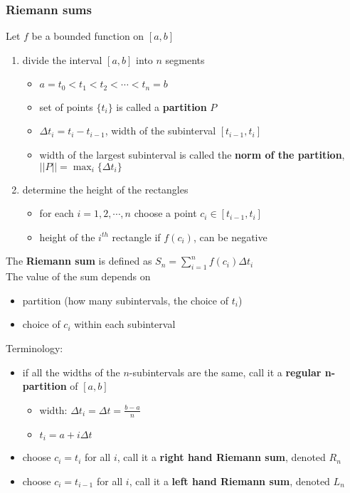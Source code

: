 \documentclass[12pt, letterpaper]{article}
\begin{document}
\subsubsection{Riemann sums}
Let $f$ be a bounded function on $[a,b]$
\begin{enumerate}
    \item divide the interval $[a,b]$ into $n$ segments
    \begin{itemize}
        \item $a = t_0 < t_1 < t_2 < \cdots < t_n = b$
        \item set of points $\{t_i\}$ is called a \textbf{partition} $P$
        \item $\Delta t_i = t_i - t_{i-1}$, width of the subinterval $[t_{i-1}, t_i]$
        \item width of the largest subinterval is called the \textbf{norm of the partition}, $||P|| = \displaystyle\max_i \{\Delta t_i\}$
    \end{itemize}
    \item determine the height of the rectangles
    \begin{itemize}
        \item for each $i = 1, 2, \cdots, n$ choose a point $c_i \in [t_{i-1}, t_i]$
        \item height of the $i^{th}$ rectangle if $f(c_i)$, can be negative
    \end{itemize}
\end{enumerate}
The \textbf{Riemann sum} is defined as $S_n = \displaystyle\sum_{i=1}^{n} f(c_i)\Delta t_i$ \\
The value of the sum depends on 
\begin{itemize}
    \item partition (how many subintervals, the choice of $t_i$)
    \item choice of $c_i$ within each subinterval
\end{itemize}
Terminology:
\begin{itemize}
    \item if all the widths of the $n$-subintervals are the same, call it a \textbf{regular n-partition} of $[a,b]$
    \begin{itemize}
        \item width: $\Delta t_i = \Delta t = \frac{b-a}{n}$
        \item $t_i = a + i\Delta t$
    \end{itemize}
    \item choose $c_i = t_i$ for all $i$, call it a \textbf{right hand Riemann sum}, denoted $R_n$
    \item choose $c_i = t_{i-1}$ for all $i$, call it a \textbf{left hand Riemann sum}, denoted $L_n$
\end{itemize}
\end{document}
